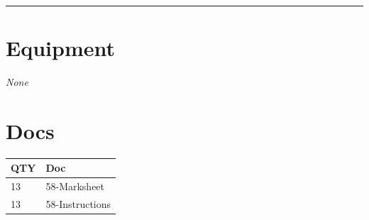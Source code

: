 \documentclass[10pt, A5]{article}
\begin{document}
\begin{framed}
\begin{minipage}{\textwidth}
\begin{multicols}{2}
		\vfill\null

		\end{multicols}

    \vspace{0.25cm}
        \hrule
        \vspace{0.25cm}

        \begin{multicols}{2}

		\section*{\faWrench \: Equipment}

				\textit{None}
		
		\vfill\null
		\columnbreak

			\section*{\faFile \: Docs}
		 	\begin{center}
			\begin{tabular}{p{2cm}p{4cm}}

			\textbf{QTY} & \textbf{Doc} \\\toprule
										13&58-Marksheet\\\midrule
										13&58-Instructions\\\midrule
							\end{tabular}
			\end{center}
	

		\vfill\null

		\end{multicols}
\end{minipage}
\end{framed}
\end{document}
